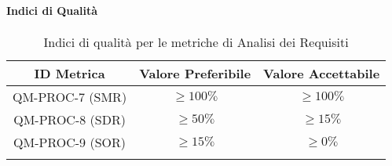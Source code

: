 		\paragraph{Indici di Qualità}

			\begin{center}
				\begin{longtable}{|c|c|c|}
				\hline
				\rowcolor{lighter-grayer}
				\textbf{ID Metrica} & \textbf{Valore Preferibile} & \textbf{Valore Accettabile}\\
				\hline
				\endfirsthead
				\hline
				QM-PROC-7 (SMR) & \(\geq 100\%\) & \(\geq 100\%\) \\
				\hline
				QM-PROC-8 (SDR) & \(\geq 50\%\) & \(\geq 15\%\) \\
				\hline
				QM-PROC-9 (SOR) & \(\geq 15\%\) & \(\geq 0\%\) \\
				\hline
				\caption{Indici di qualità per le metriche di Analisi dei Requisiti}
				\end{longtable}
			\end{center}






